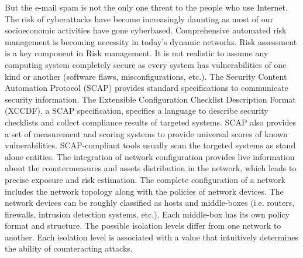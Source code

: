 \documentclass[14pt]{article}
\begin{document}
	But the e-mail spam is not the only one threat to the people who use Internet. The risk of cyberattacks have become increasingly daunting as most of our socioeconomic activities have gone cyberbased. Comprehensive automated risk management is becoming necessity in today’s dynamic networks. Risk assessment is a key component in Risk management. It is not realistic to assume any computing system completely secure as every system has vulnerabilities of one kind or another (software ﬂaws, misconﬁgurations, etc.).
	The Security Content Automation Protocol (SCAP) provides standard speciﬁcations to communicate security information. The Extensible Conﬁguration Checklist Description Format (XCCDF), a SCAP speciﬁcation, speciﬁes a language to describe security checklists and collect compliance results of targeted systems. SCAP also provides a set of measurement and scoring systems to provide universal scores of known vulnerabilities. SCAP-compliant tools usually scan the targeted systems as stand alone entities.
	The integration of network conﬁguration provides live information about the countermeasures and assets distribution in the network, which leads to precise exposure and risk estimation. 	The complete conﬁguration of a network includes the network topology along with the policies of network devices. The network devices can be roughly classiﬁed as hosts and middle-boxes (i.e. routers, ﬁrewalls, intrusion detection systems, etc.). Each middle-box has its own policy format and structure. The possible isolation levels diﬀer from one network to another. Each isolation level is associated with a value that intuitively determines the ability of counteracting attacks. 
		
\end{document}
